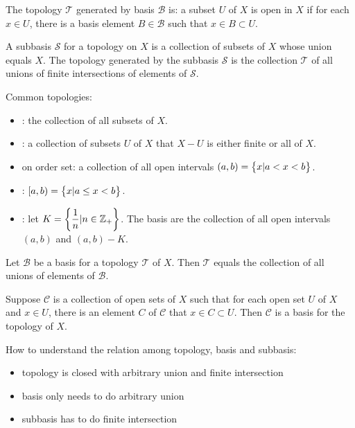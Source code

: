 The topology $\mathcal{T}$ generated by basis $\mathcal{B}$ is: a subset $U$ of $X$ is open in $X$ if for each $x \in U$, there is a basis element $B \in \mathcal{B}$ such that $x \in B \subset U$.


\begin{definition}
    A subbasis $\mathcal{S}$ for a topology on $X$ is a collection of subsets of $X$ whose union equals $X$. The topology generated by the subbasis $\mathcal{S}$ is the collection $\mathcal{T}$ of all unions of finite intersections of elements of $\mathcal{S}$.
\end{definition}


\begin{example}
    Common topologies:
\begin{itemize}
    \item {}: the collection of all subsets of $X$.
    \item {}: a collection of subsets $U$ of $X$ that $X - U$ is either finite or all of $X$.
    \item {} on order set: a collection of all open intervals $(a,b) = \set{x | a < x < b}$.
    \item {} : $[a,b) = \set{x | a \leq x < b}$.
    \item {}: let $K = \set{\displaystyle \frac{1}{n} | n \in \mathbb{Z}_{+}}$. The basis are the collection of all open intervals $(a,b)$ and $(a,b) - K$.
\end{itemize}
\end{example}





\begin{theorem}
    Let $\mathcal{B}$ be a basis for a topology $\mathcal{T}$ of $X$. Then $\mathcal{T}$ equals the collection of all unions of elements of $\mathcal{B}$.
\end{theorem}

\begin{theorem}
    Suppose $\mathcal{C}$ is a collection of open sets of $X$ such that for each open set $U$ of $X$ and $x \in U$, there is an element $C$ of $\mathcal{C}$ that $x \in C \subset U$. Then $\mathcal{C}$ is a basis for the topology of $X$.    
\end{theorem}


How to understand the relation among topology, basis and subbasis:
\begin{itemize}
    \item topology is closed with arbitrary union and finite intersection
    \item basis only needs to do arbitrary union
    \item subbasis has to do finite intersection
\end{itemize}



